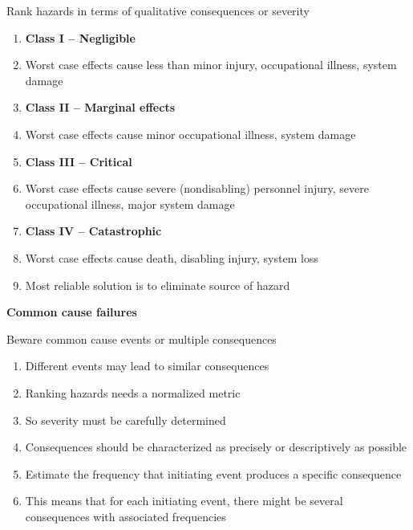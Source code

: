 \documentclass[aspectratio=1610,pdftex,dvipsnames,compress,xcolor={dvipsnames}]{beamer}
\begin{document}
\addtocounter{framenumber}{-1}
\begin{frame}{Rank hazards in terms of qualitative consequences or severity}
    \begin{enumerate}[series=outerlist,topsep=0pt,itemsep=3pt,leftmargin=*,label=(\arabic*)]
        \item[]\textbf{Class I -- Negligible}
        \item[]Worst case effects cause less than minor injury, occupational illness, system damage
            \vspace{0.10in}
        \item[]\textbf{Class II -- Marginal effects}
        \item[]Worst case effects cause minor occupational illness, system damage
            \vspace{0.10in}
        \item[]\textbf{Class III -- Critical}
        \item[]Worst case effects cause severe (nondisabling) personnel injury, severe occupational illness, major system damage
            \vspace{0.10in}
        \item[]\textbf{Class IV -- Catastrophic}
        \item[]Worst case effects cause death, disabling injury, system loss
            \vspace{0.25in}
        \item[]Most reliable solution is to eliminate source of hazard
    \end{enumerate}
\end{frame}


\begin{frame}[plain]{}
    \centering\LARGE\textbf{Common cause failures}
\end{frame}


\addtocounter{framenumber}{-1}
\begin{frame}{Beware common cause events or multiple consequences}
    \begin{enumerate}[series=outerlist,topsep=0pt,itemsep=21pt,leftmargin=*,label=(\arabic*)]
        \item[]Different events may lead to similar consequences
        \item[]Ranking hazards needs a normalized metric
        \item[]So severity must be carefully determined 
        \item[]Consequences should be characterized as precisely or descriptively as possible 
        \item[]Estimate the frequency that initiating event produces a specific consequence 
        \item[]This means that for each initiating event, there might be several consequences with associated frequencies
    \end{enumerate}
\end{frame}
\end{document}
